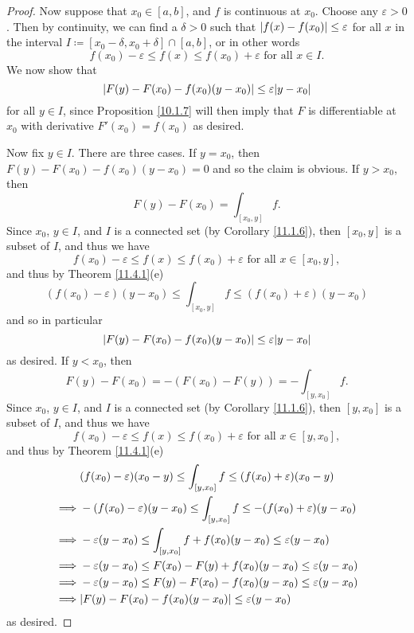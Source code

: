 \begin{proof}
    Now suppose that \(x_0 \in [a, b]\), and \(f\) is continuous at \(x_0\).
    Choose any \(\varepsilon > 0\).
    Then by continuity, we can find a \(\delta > 0\) such that \(\abs*{f(x) - f(x_0)} \leq \varepsilon\) for all \(x\) in the interval \(I \coloneqq [x_0 - \delta, x_0 + \delta] \cap [a, b]\), or in other words
    \[
        f(x_0) - \varepsilon \leq f(x) \leq f(x_0) + \varepsilon \text{ for all } x \in I.
    \]
    We now show that
    \[
        \abs*{F(y) - F(x_0) - f(x_0)(y - x_0)} \leq \varepsilon \abs*{y - x_0}
    \]
    for all \(y \in I\), since Proposition \ref{10.1.7} will then imply that \(F\) is differentiable at \(x_0\) with derivative \(F'(x_0) = f(x_0)\) as desired.

    Now fix \(y \in I\).
    There are three cases.
    If \(y = x_0\), then \(F(y) - F(x_0) - f(x_0)(y - x_0) = 0\) and so the claim is obvious.
    If \(y > x_0\), then
    \[
        F(y) - F(x_0) = \int_{[x_0, y]} f.
    \]
    Since \(x_0\), \(y \in I\), and \(I\) is a connected set (by Corollary \ref{11.1.6}), then \([x_0, y]\) is a subset of \(I\), and thus we have
    \[
        f(x_0) - \varepsilon \leq f(x) \leq f(x_0) + \varepsilon \text{ for all } x \in [x_0, y],
    \]
    and thus by Theorem \ref{11.4.1}(e)
    \[
        (f(x_0) - \varepsilon) (y - x_0) \leq \int_{[x_0, y]} f \leq (f(x_0) + \varepsilon) (y - x_0)
    \]
    and so in particular
    \[
        \abs*{F(y) - F(x_0) - f(x_0)(y - x_0)} \leq \varepsilon \abs*{y - x_0}
    \]
    as desired.
    If \(y < x_0\), then
    \[
        F(y) - F(x_0) = - (F(x_0) - F(y)) = -\int_{[y, x_0]} f.
    \]
    Since \(x_0\), \(y \in I\), and \(I\) is a connected set (by Corollary \ref{11.1.6}), then \([y, x_0]\) is a subset of \(I\), and thus we have
    \[
        f(x_0) - \varepsilon \leq f(x) \leq f(x_0) + \varepsilon \text{ for all } x \in [y, x_0],
    \]
    and thus by Theorem \ref{11.4.1}(e)
    \begin{align*}
                 & (f(x_0) - \varepsilon) (x_0 - y) \leq \int_{[y, x_0]} f \leq (f(x_0) + \varepsilon) (x_0 - y)   \\
        \implies & -(f(x_0) - \varepsilon) (y - x_0) \leq \int_{[y, x_0]} f \leq -(f(x_0) + \varepsilon) (y - x_0) \\
        \implies & -\varepsilon (y - x_0) \leq \int_{[y, x_0]} f + f(x_0)(y - x_0) \leq \varepsilon (y - x_0)      \\
        \implies & -\varepsilon (y - x_0) \leq F(x_0) - F(y) + f(x_0)(y - x_0) \leq \varepsilon (y - x_0)          \\
        \implies & -\varepsilon (y - x_0) \leq F(y) - F(x_0) - f(x_0)(y - x_0) \leq \varepsilon (y - x_0)          \\
        \implies & \abs*{F(y) - F(x_0) - f(x_0)(y - x_0)} \leq \varepsilon (y - x_0)
    \end{align*}
    as desired.
\end{proof}


